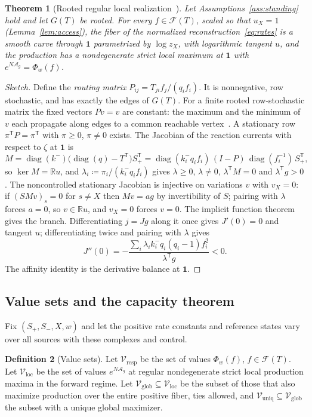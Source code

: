 \documentclass[11pt,a4paper]{article}
\theoremstyle{plain}
\newtheorem{theorem}{Theorem}[section]
\theoremstyle{definition}
\newtheorem{definition}[theorem]{Definition}
\theoremstyle{remark}
\numberwithin{equation}{section}
\newcommand{\R}{\mathbb{R}}
\newcommand{\T}{\mathsf{T}}
\newcommand{\Sp}{S_{+}}
\newcommand{\Sm}{S_{-}}
\newcommand{\one}{\mathbf{1}}
\newcommand{\cone}{\mathcal{F}}
\newcommand{\Vresp}{\mathcal{V}_{\mathrm{resp}}}
\newcommand{\Vloc}{\mathcal{V}_{\mathrm{loc}}}
\newcommand{\Vglob}{\mathcal{V}_{\mathrm{glob}}}
\newcommand{\Vuniq}{\mathcal{V}_{\mathrm{uniq}}}
\newcommand{\Diag}{\operatorname{diag}}
\newcommand{\Ker}{\operatorname{ker}}
\begin{document}
\begin{theorem}[Rooted regular local realization~{\citep[Theorem~5.15]{companion2026}}]\label{thm:local}
Let Assumptions~\ref{ass:standing} hold and let $G(T)$ be rooted. For every $f\in\cone(T)$, scaled so that $u_X=1$ (Lemma~\ref{lem:access}), the fiber of the normalized reconstruction~\eqref{eq:rates} is a smooth curve through $\one$ parametrized by $\log z_X$, with logarithmic tangent $u$, and the production has a nondegenerate strict local maximum at $\one$ with $e^{N\mathcal A_g}=\Phi_w(f)$.
\end{theorem}
\begin{proof}[Sketch]
Define the \emph{routing matrix} $P_{ij}=T_{ji}f_j/(q_if_i)$. It is nonnegative, row stochastic, and has exactly the edges of $G(T)$. For a finite rooted row-stochastic matrix the fixed vectors $Pv=v$ are constant: the maximum and the minimum of $v$ each propagate along edges to a common reachable vertex~\citep{kemeny1976,seneta2006}. A stationary row $\pi^{\T}P=\pi^{\T}$ with $\pi\ge0$, $\pi\ne0$ exists. The Jacobian of the reaction currents with respect to $\zeta$ at $\one$ is
\[
 M=\Diag(k^-)\big(\Diag(q)-T^{\T}\big)\Sp^{\T}=\Diag(k^-_iq_if_i)\,(I-P)\,\Diag(f_i^{-1})\,\Sp^{\T},
\]
so $\Ker M=\R u$, and $\lambda_i\coloneqq\pi_i/(k^-_iq_if_i)$ gives $\lambda\ge0$, $\lambda\ne0$, $\lambda^{\T}M=0$ and $\lambda^{\T}g>0$. The noncontrolled stationary Jacobian is injective on variations $v$ with $v_X=0$: if $(SMv)_s=0$ for $s\ne X$ then $Mv=ag$ by invertibility of $S$; pairing with $\lambda$ forces $a=0$, so $v\in\R u$, and $v_X=0$ forces $v=0$. The implicit function theorem gives the branch. Differentiating $j=Jg$ along it once gives $J'(0)=0$ and tangent $u$; differentiating twice and pairing with $\lambda$ gives
\begin{equation}\label{eq:curvature}
 J''(0)=-\frac{\sum_i\lambda_ik^-_iq_i(q_i-1)f_i^2}{\lambda^{\T}g}<0 .
\end{equation}
The affinity identity is the derivative balance at $\one$.
\end{proof}

\subsection{Value sets and the capacity theorem}
Fix $(\Sp,\Sm,X,w)$ and let the positive rate constants and reference states vary over all sources with these complexes and control.

\begin{definition}[Value sets]\label{def:valuesets}
Let $\Vresp$ be the set of values $\Phi_w(f)$, $f\in\cone(T)$. Let $\Vloc$ be the set of values $e^{N\mathcal A_g}$ at regular nondegenerate strict local production maxima in the forward regime. Let $\Vglob\subseteq\Vloc$ be the subset of those that also maximize production over the entire positive fiber, ties allowed, and $\Vuniq\subseteq\Vglob$ the subset with a unique global maximizer.
\end{definition}
\end{document}
